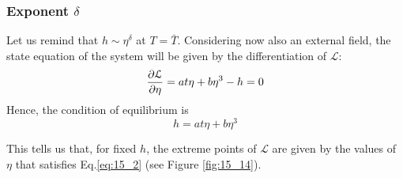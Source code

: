 \documentclass[../../Main/Main.tex]{subfiles}
\begin{document}
\subsubsection{Exponent \( \delta  \)}
Let us remind that \( h \sim \eta ^ \delta  \) at \( T = \bar{T}  \).
Considering now also an external field, the state equation of the system will be given by the differentiation of \( \mathcal{L} \):
\begin{equation*}
  \pdv{\mathcal{L}}{\eta } = a t \eta + b \eta ^3 - h = 0
\end{equation*}
Hence, the condition of equilibrium is
\begin{equation}
  h = a t \eta + b \eta ^3
  \label{eq:15_2}
\end{equation}



This tells us that, for fixed \( h \), the extreme points of \( \mathcal{L} \) are given by the values of \( \eta  \) that satisfies Eq.\eqref{eq:15_2} (see Figure \ref{fig:15_14}).

\begin{figure}[H]
\begin{minipage}[c]{0.5\linewidth}
\end{minipage}
\begin{minipage}[]{0.5\linewidth}
\centering
{}
\end{minipage}
\end{figure}
\end{document}
